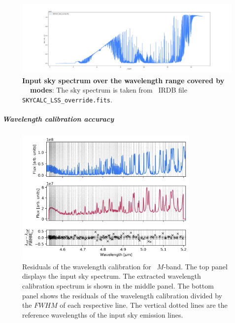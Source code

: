 \begin{figure}[!h]
  \centering
  \includegraphics[width=\textwidth]{figures/LSS_CrtAlg_files/SKYCALC_LSS_override.fits.png}
  \caption{\textbf{Input sky spectrum over the wavelength range covered by \met~\lss~modes}: The sky spectrum is taken from \met~IRDB file \texttt{SKYCALC\_LSS\_override.fits}. }
  \label{fig:sky_spec}
\end{figure}

\subparagraph{Wavelength calibration accuracy}\label{sec:critalg_wavecal_acc}
\begin{figure}[!ht]
  \centering
  \includegraphics[width=0.8\textwidth]{figures/LSS_CrtAlg_files/Residuals_m.png}
  \caption{Residuals of the wavelength calibration for \lss~$M$-band. The top panel displays the input sky spectrum. The extracted wavelength calibration spectrum is shown in the middle panel. The bottom panel shows the residuals of the wavelength calibration divided by the $FWHM$ of each respective line. The vertical dotted lines are the reference wavelengths of the input sky emission lines. }
  \label{fig:r_m}
\end{figure}


